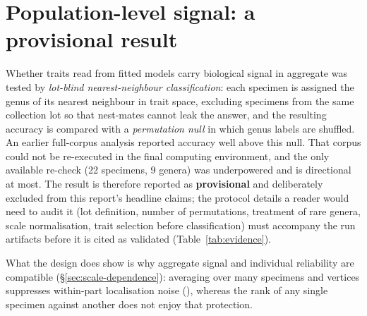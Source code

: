 \section{Population-level signal: a provisional result}
\label{sec:genus}

Whether traits read from fitted models carry biological signal in aggregate
was tested by \emph{lot-blind nearest-neighbour classification}: each
specimen is assigned the genus of its nearest neighbour in trait space,
excluding specimens from the same collection lot so that nest-mates cannot
leak the answer, and the resulting accuracy is compared with a
\emph{permutation null} in which genus labels are shuffled. An earlier
full-corpus analysis reported accuracy well above this null. That corpus
could not be re-executed in the final computing environment, and the only
available re-check (22 specimens, 9 genera) was underpowered and is
directional at most. The result is therefore reported as \textbf{provisional}
and deliberately excluded from this report's headline claims; the protocol
details a reader would need to audit it (lot definition, number of
permutations, treatment of rare genera, scale normalisation, trait selection
before classification) must accompany the run artifacts before it is cited
as validated (Table~\ref{tab:evidence}).

What the design does show is why aggregate signal and individual reliability
are compatible (\S\ref{sec:scale-dependence}): averaging over many specimens
and vertices suppresses within-part localisation noise (), whereas the
rank of any single specimen against another does not enjoy that protection.
